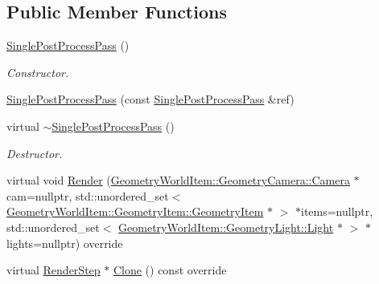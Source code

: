 \subsection*{Public Member Functions}
\begin{DoxyCompactItemize}
\item 
\mbox{\label{class_geometry_engine_1_1_geometry_render_step_1_1_single_post_process_pass_a7e52df17831d97acda83a9d664fbe0b9}} 
\mbox{\hyperlink{class_geometry_engine_1_1_geometry_render_step_1_1_single_post_process_pass_a7e52df17831d97acda83a9d664fbe0b9}{Single\+Post\+Process\+Pass}} ()
\begin{DoxyCompactList}\small\item\em Constructor. \end{DoxyCompactList}\item 
\mbox{\hyperlink{class_geometry_engine_1_1_geometry_render_step_1_1_single_post_process_pass_a14c18577923851d3d839ddd57832a326}{Single\+Post\+Process\+Pass}} (const \mbox{\hyperlink{class_geometry_engine_1_1_geometry_render_step_1_1_single_post_process_pass}{Single\+Post\+Process\+Pass}} \&ref)
\item 
\mbox{\label{class_geometry_engine_1_1_geometry_render_step_1_1_single_post_process_pass_a7ca39a13a8373eec4c9a2f48c98bfe07}} 
virtual \mbox{\hyperlink{class_geometry_engine_1_1_geometry_render_step_1_1_single_post_process_pass_a7ca39a13a8373eec4c9a2f48c98bfe07}{$\sim$\+Single\+Post\+Process\+Pass}} ()
\begin{DoxyCompactList}\small\item\em Destructor. \end{DoxyCompactList}\item 
virtual void \mbox{\hyperlink{class_geometry_engine_1_1_geometry_render_step_1_1_single_post_process_pass_abb6e6e69af639e0c1bd8b1ec7c73a44c}{Render}} (\mbox{\hyperlink{class_geometry_engine_1_1_geometry_world_item_1_1_geometry_camera_1_1_camera}{Geometry\+World\+Item\+::\+Geometry\+Camera\+::\+Camera}} $\ast$cam=nullptr, std\+::unordered\+\_\+set$<$ \mbox{\hyperlink{class_geometry_engine_1_1_geometry_world_item_1_1_geometry_item_1_1_geometry_item}{Geometry\+World\+Item\+::\+Geometry\+Item\+::\+Geometry\+Item}} $\ast$ $>$ $\ast$items=nullptr, std\+::unordered\+\_\+set$<$ \mbox{\hyperlink{class_geometry_engine_1_1_geometry_world_item_1_1_geometry_light_1_1_light}{Geometry\+World\+Item\+::\+Geometry\+Light\+::\+Light}} $\ast$ $>$ $\ast$lights=nullptr) override
\item 
virtual \mbox{\hyperlink{class_geometry_engine_1_1_geometry_render_step_1_1_render_step}{Render\+Step}} $\ast$ \mbox{\hyperlink{class_geometry_engine_1_1_geometry_render_step_1_1_single_post_process_pass_adbbe0bb9d41386ced4080877f030407a}{Clone}} () const override
\end{DoxyCompactItemize}

